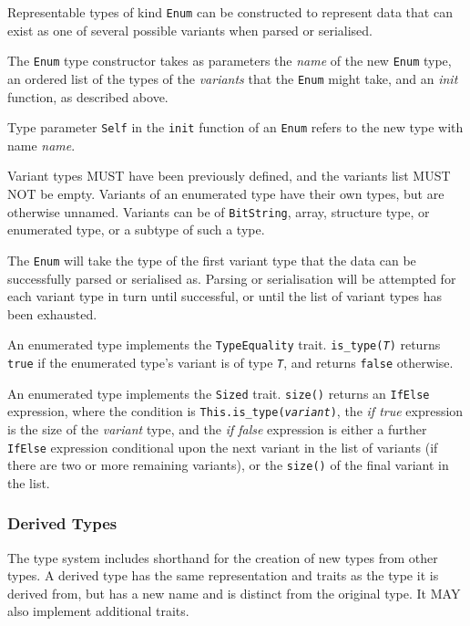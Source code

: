 \documentclass[10pt,twocolumn,a4paper]{article}
\newcommand{\code}[1]{\texttt{#1}}
\begin{document}
Representable types of kind \code{Enum} can be constructed to represent
data that can exist as one of several possible variants when parsed or
serialised.

The \code{Enum} type constructor takes as parameters the \emph{name} of the
new \code{Enum} type, an ordered list of the types of the \emph{variants} that
the \code{Enum} might take, and an \emph{init} function, as described above.

Type parameter \code{Self} in the \code{init} function of an \code{Enum} refers
to the new type with name \emph{name}.

Variant types MUST have been
previously defined, and the variants list MUST NOT be empty. Variants of
an enumerated type have their own types, but are otherwise unnamed.
Variants can be of \code{BitString}, array, structure type, or enumerated type, or
a subtype of such a type.

The \code{Enum} will take the type of the first variant type that the data can be
successfully parsed or serialised as. Parsing or serialisation will be attempted for each
variant type in turn until successful, or until the list of variant types has been
exhausted.

An enumerated type implements the \code{TypeEquality} trait.
\code{is\_type(\emph{T})} returns \code{true} if the enumerated type's variant
is of type \code{\emph{T}}, and returns \code{false} otherwise.

An enumerated type implements the \code{Sized} trait.  \code{size()}
returns an \code{IfElse} expression, where the condition is
\code{This.is\_type(\emph{variant})}, the \emph{if true} expression is
the size of the \emph{variant} type, and the \emph{if false} expression is
either a further \code{IfElse} expression conditional upon the next variant in
the list of variants (if there are two or more remaining variants), or the
\code{size()} of the final variant in the list.

\subsubsection{Derived Types}

The type system includes shorthand for the creation of new types from other
types. A derived type has the same representation
and traits as the type it is derived from, but has a new name and is
distinct from the original type. It MAY also implement additional traits.
\end{document}
